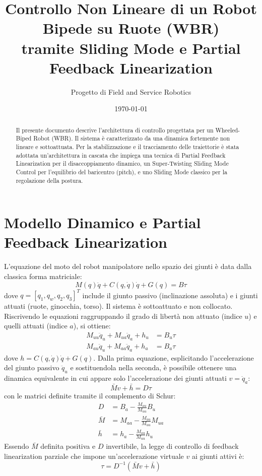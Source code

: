 \documentclass[11pt,a4paper]{article}
\title{\textbf{Controllo Non Lineare di un Robot Bipede su Ruote (WBR)\\tramite Sliding Mode e Partial Feedback Linearization}}
\author{Progetto di Field and Service Robotics}
\date{\today}
\begin{document}
\maketitle

\begin{abstract}
Il presente documento descrive l'architettura di controllo progettata per un Wheeled-Biped Robot (WBR). Il sistema è caratterizzato da una dinamica fortemente non lineare e sottoattuata. Per la stabilizzazione e il tracciamento delle traiettorie è stata adottata un'architettura in cascata che impiega una tecnica di Partial Feedback Linearization per il disaccoppiamento dinamico, un Super-Twisting Sliding Mode Control per l'equilibrio del baricentro (pitch), e uno Sliding Mode classico per la regolazione della postura.
\end{abstract}

\section{Modello Dinamico e Partial Feedback Linearization}

L'equazione del moto del robot manipolatore nello spazio dei giunti è data dalla classica forma matriciale:
\begin{equation}
    M(q)\ddot{q} + C(q,\dot{q})\dot{q} + G(q) = B \tau
\end{equation}
dove $q = [q_1, q_w, q_2, q_3]^T$ include il giunto passivo (inclinazione assoluta) e i giunti attuati (ruote, ginocchia, torso). Il sistema è sottoattuato e non collocato. Riscrivendo le equazioni raggruppando il grado di libertà non attuato (indice $u$) e quelli attuati (indice $a$), si ottiene:
\begin{align}
    M_{uu} \ddot{q}_u + M_{ua} \ddot{q}_a + h_u &= B_u \tau \\
    M_{au} \ddot{q}_u + M_{aa} \ddot{q}_a + h_a &= B_a \tau
\end{align}
dove $h = C(q,\dot{q})\dot{q} + G(q)$. Dalla prima equazione, esplicitando l'accelerazione del giunto passivo $\ddot{q}_u$ e sostituendola nella seconda, è possibile ottenere una dinamica equivalente in cui appare solo l'accelerazione dei giunti attuati $v = \ddot{q}_a$:
\begin{equation}
    \bar{M} v + \bar{h} = D \tau
\end{equation}
con le matrici definite tramite il complemento di Schur:
\begin{align}
    D &= B_a - \frac{M_{au}}{M_{uu}} B_u \\
    \bar{M} &= M_{aa} - \frac{M_{au}}{M_{uu}} M_{ua} \\
    \bar{h} &= h_a - \frac{M_{au}}{M_{uu}} h_u
\end{align}
Essendo $\bar{M}$ definita positiva e $D$ invertibile, la legge di controllo di feedback linearization parziale che impone un'accelerazione virtuale $v$ ai giunti attivi è:
\begin{equation}
    \tau = D^{-1} (\bar{M} v + \bar{h})
\end{equation}
\end{document}
